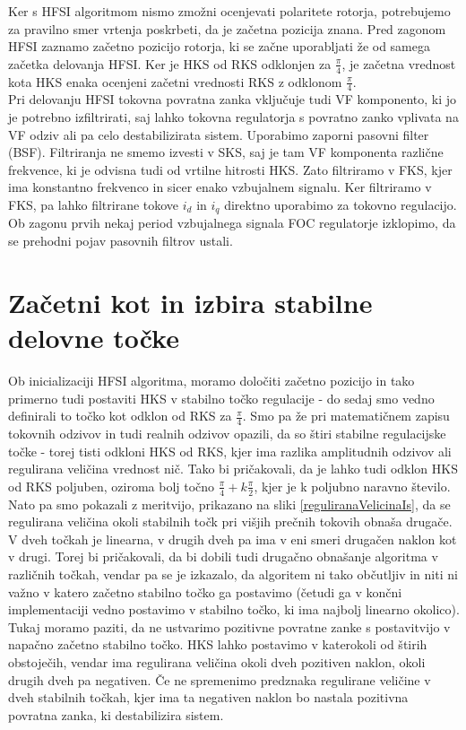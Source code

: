 \documentclass[a4paper,twoside,openright,12pt,slovene]{book}
\begin{document}
Ker s HFSI algoritmom nismo zmožni ocenjevati polaritete rotorja, potrebujemo za pravilno smer vrtenja poskrbeti, da je začetna pozicija znana. Pred zagonom HFSI zaznamo začetno pozicijo rotorja, ki
se začne uporabljati že od samega začetka delovanja HFSI. Ker je HKS od RKS odklonjen za $\frac{\pi}{4}$, je začetna vrednost kota HKS enaka ocenjeni začetni vrednosti RKS z odklonom $\frac{\pi}{4}$.
\\
Pri delovanju HFSI tokovna povratna zanka vključuje tudi VF komponento, ki jo je potrebno izfiltrirati, saj lahko tokovna regulatorja s povratno zanko vplivata na VF odziv ali pa celo destabilizirata
sistem. Uporabimo zaporni pasovni filter (BSF). Filtriranja ne smemo izvesti v SKS, saj je tam VF komponenta različne frekvence, ki je odvisna tudi od vrtilne hitrosti HKS. Zato filtriramo v FKS, kjer
ima konstantno frekvenco in sicer enako vzbujalnem signalu. Ker filtriramo v FKS, pa lahko filtrirane tokove $i_d$ in $i_q$ direktno uporabimo za tokovno regulacijo. Ob zagonu prvih nekaj period
vzbujalnega signala FOC regulatorje izklopimo, da se prehodni pojav pasovnih filtrov ustali. 


\section{Začetni kot in izbira stabilne delovne točke}

Ob inicializaciji HFSI algoritma, moramo določiti začetno pozicijo in tako primerno tudi postaviti HKS v stabilno točko regulacije - do sedaj smo vedno definirali to točko kot odklon od RKS za
$\frac{\pi}{4}$. Smo pa že pri matematičnem zapisu tokovnih odzivov in tudi realnih odzivov opazili, da so štiri stabilne regulacijske točke - torej tisti odkloni HKS od RKS, kjer ima razlika amplitudnih
odzivov ali regulirana veličina vrednost nič. Tako bi pričakovali, da je lahko tudi odklon HKS od RKS poljuben, oziroma bolj točno $\frac{\pi}{4} + k\frac{\pi}{2}$, kjer je k poljubno naravno število.
Nato pa smo pokazali z meritvijo, prikazano na sliki \ref{reguliranaVelicinaIs}, da se regulirana veličina okoli stabilnih točk pri višjih prečnih tokovih obnaša drugače. V dveh točkah je linearna, v
drugih dveh pa ima v eni smeri drugačen naklon kot v drugi. Torej bi pričakovali, da bi dobili tudi drugačno obnašanje algoritma v različnih točkah, vendar pa se je izkazalo, da algoritem ni tako
občutljiv in niti ni važno v katero začetno stabilno točko ga postavimo (četudi ga v končni implementaciji vedno postavimo v stabilno točko, ki ima najbolj linearno okolico). Tukaj moramo paziti, da
ne ustvarimo pozitivne povratne zanke s postavitvijo v napačno začetno stabilno točko. HKS lahko postavimo v katerokoli od štirih obstoječih, vendar ima regulirana veličina okoli dveh pozitiven
naklon, okoli drugih dveh pa negativen. Če ne spremenimo predznaka regulirane veličine v dveh stabilnih točkah, kjer ima ta negativen naklon bo nastala pozitivna povratna zanka, ki destabilizira
sistem.
\end{document}
